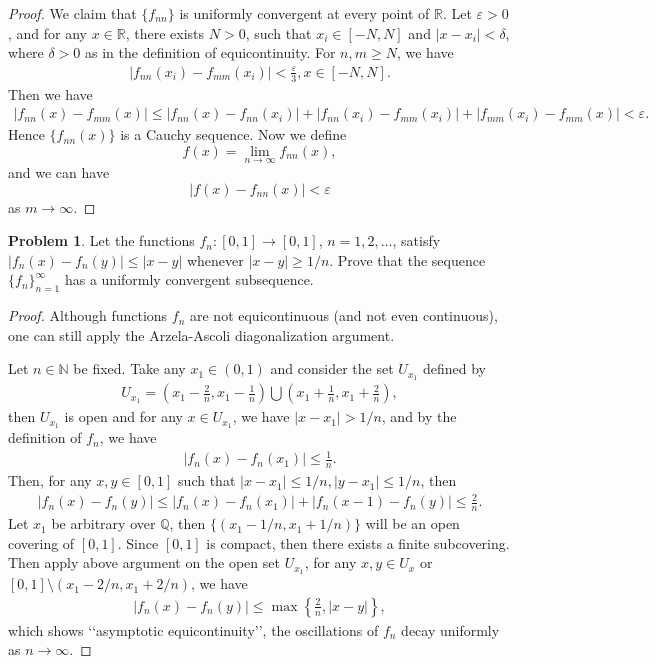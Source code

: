\documentclass[11pt]{article}
\theoremstyle{definition}
\newtheorem{problem}{Problem}
\theoremstyle{definition}
\begin{document}
\begin{proof}
We claim that $\{f_{nn}\}$ is uniformly convergent at every point of $\mathbb{R}$. Let $\varepsilon > 0$, and for any $x\in \mathbb{R}$, there exists $N > 0$, such that $x_i\in [-N,N]$ and $|x - x_i| < \delta$, where $\delta > 0$ as in the definition of equicontinuity. For $n,m \geq N$, we have
\begin{align*}
    \left|f_{nn}(x_i) - f_{mm}(x_i)\right| < \frac{\varepsilon}{3}, x\in [-N, N].
\end{align*}
Then we have
\begin{align*}
    |f_{nn}(x) - f_{mm}(x)| \leq |f_{nn}(x) - f_{nn}(x_i)| + |f_{nn}(x_i) - f_{mm}(x_i)| + |f_{mm}(x_i) - f_{mm}(x)| < \varepsilon.
\end{align*}
Hence $\{f_{nn}(x)\}$ is a Cauchy sequence. Now we define $$f(x) = \lim_{n\to\infty}f_{nn}(x),$$
and we can have
$$|f(x) - f_{nn}(x)| < \varepsilon$$
as $m\to\infty$.
\end{proof}

\medskip

\begin{problem}
Let the functions $f_n:[0,1]\to [0,1]$, $n=1,2,\ldots$,
satisfy $\left|f_n(x)-f_n(y)\right|\leq \left|x-y\right|$ whenever $\left|x-y\right| \geq 1/n$. Prove that the sequence $\{ f_n\}_{n=1}^\infty$ has a uniformly convergent subsequence.
\end{problem}
\begin{proof}
Although functions $f_n$ are not equicontinuous (and not even continuous), one can still apply the Arzela-Ascoli diagonalization argument\cite{1}.

Let $n \in \mathbb{N}$ be fixed. Take any $x_1 \in (0,1)$ and consider the set $U_{x_1}$ defined by
\begin{align*}
    U_{x_1} = \left(x_1 - \frac{2}{n}, x_1 - \frac{1}{n} \right) \bigcup \left(x_1 + \frac{1}{n}, x_1 + \frac{2}{n} \right),
\end{align*}
then $U_{x_1}$ is open and for any $x \in U_{x_1}$, we have $\left|x - x_1\right| > 1/n$, and by the definition of $f_n$, we have
\begin{align*}
    \left| f_n(x) - f_n(x_1) \right| \leq \frac{1}{n}.
\end{align*}
Then, for any $x, y \in [0,1]$ such that $\left|x - x_1\right| \leq 1/n, \left|y - x_1\right| \leq 1/n$, then 
\begin{align*}
    \left| f_n(x) - f_n(y) \right| \leq \left| f_n(x) - f_n(x_1) \right| + \left| f_n(x-1) - f_n(y) \right| \leq \frac{2}{n}.
\end{align*}
Let $x_1$ be arbitrary over $\mathbb{Q}$, then $\{\left(x_1 - 1/n, x_1 + 1/n\right)\}$ will be an open covering of $[0,1]$. Since $[0,1]$ is compact, then there exists a finite subcovering. Then apply above argument on the open set $U_{x_1}$, for any $x, y \in U_x$ or $[0,1] \setminus \left(x_1 - 2/n, x_1 + 2/n\right)$, we have
\begin{align*}
    \left| f_n(x) - f_n(y) \right| \leq \max \left\{ \frac{2}{n}, \left|x - y\right| \right\},
\end{align*}
which shows ‘‘asymptotic equicontinuity’’, the oscillations of $f_n$ decay uniformly as $n \to \infty$.
\end{proof}
\end{document}
